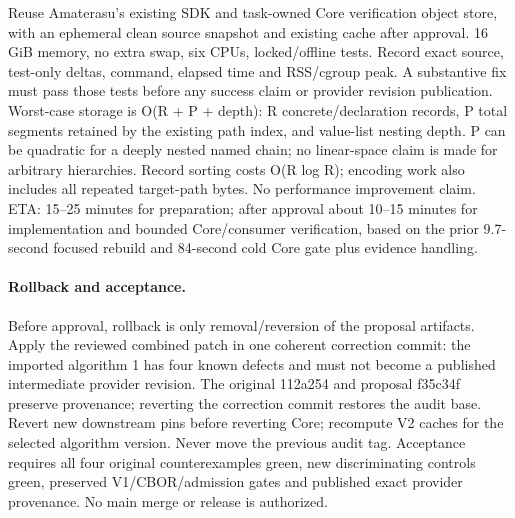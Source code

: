 \documentclass[11pt,a4paper]{article}
\begin{document}
Reuse Amaterasu's existing SDK and task-owned Core verification object store,
with an ephemeral clean source snapshot and existing cache after approval.
16 GiB memory, no extra swap, six CPUs, locked/offline tests. Record exact source,
test-only deltas, command, elapsed time and RSS/cgroup peak. A substantive fix
must pass those tests before any success claim or provider revision publication.
Worst-case storage is O(R + P + depth): R concrete/declaration records, P total
segments retained by the existing path index, and value-list nesting depth.
P can be quadratic for a deeply nested named chain; no linear-space claim is made
for arbitrary hierarchies. Record sorting costs O(R log R); encoding work also
includes all repeated target-path bytes. No performance improvement claim.
ETA: 15--25 minutes for preparation; after approval about 10--15 minutes for
implementation and bounded Core/consumer verification, based on the prior
9.7-second focused rebuild and 84-second cold Core gate plus evidence handling.

\paragraph{Rollback and acceptance.}
Before approval, rollback is only removal/reversion of the proposal artifacts.
Apply the reviewed combined patch in one coherent correction commit: the imported
algorithm 1 has four known defects and must not become a published intermediate
provider revision. The original 112a254 and proposal f35c34f preserve provenance;
reverting the correction commit restores the audit base. Revert new downstream pins before
reverting Core; recompute V2 caches for the selected algorithm version. Never
move the previous audit tag. Acceptance requires all four original counterexamples
green, new discriminating controls green, preserved V1/CBOR/admission gates and
published exact provider provenance. No main merge or release is authorized.

\end{document}
